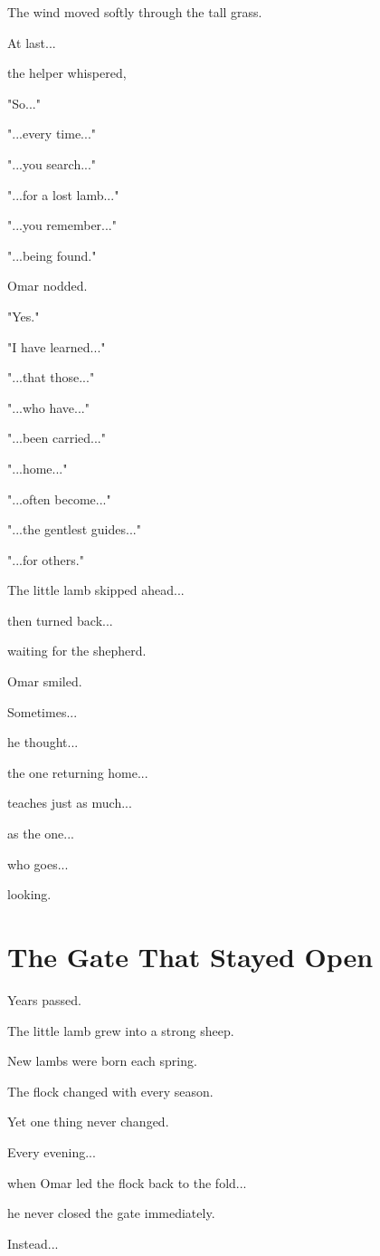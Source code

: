 \documentclass[12pt,openany]{book}
\begin{document}
The wind moved softly through the tall grass.

At last...

the helper whispered,

"So..."

"...every time..."

"...you search..."

"...for a lost lamb..."

"...you remember..."

"...being found."

Omar nodded.

"Yes."

"I have learned..."

"...that those..."

"...who have..."

"...been carried..."

"...home..."

"...often become..."

"...the gentlest guides..."

"...for others."

The little lamb skipped ahead...

then turned back...

waiting for the shepherd.

Omar smiled.

Sometimes...

he thought...

the one returning home...

teaches just as much...

as the one...

who goes...

looking.
\section*{The Gate That Stayed Open}

Years passed.

The little lamb grew into a strong sheep.

New lambs were born each spring.

The flock changed with every season.

Yet one thing never changed.

Every evening...

when Omar led the flock back to the fold...

he never closed the gate immediately.

Instead...
\end{document}
